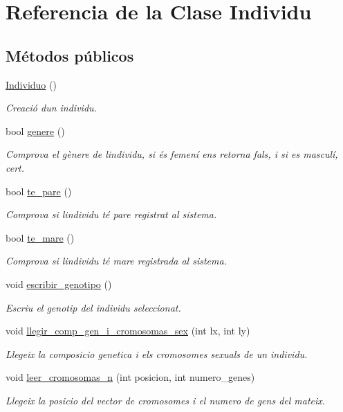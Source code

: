 \hypertarget{class_individu}{}\section{Referencia de la Clase Individu}
\label{class_individu}
\subsection*{Métodos públicos}
\begin{DoxyCompactItemize}
\item 
\hyperlink{class_individu_ab4416ff2c59e726dde0e43bc1789bcd1}{Individuo} ()
\begin{DoxyCompactList}\small\item\em Creació d\textquotesingle{}un individu. \end{DoxyCompactList}\item 
bool \hyperlink{class_individu_a65703ed67fc7ae3680f029ab299ca0c6}{genere} ()
\begin{DoxyCompactList}\small\item\em Comprova el gènere de l\textquotesingle{}individu, si és femení ens retorna fals, i si es masculí, cert. \end{DoxyCompactList}\item 
bool \hyperlink{class_individu_a6972de5e5cf268c724109924d4d9e1b1}{te\+\_\+pare} ()
\begin{DoxyCompactList}\small\item\em Comprova si l\textquotesingle{}individu té pare registrat al sistema. \end{DoxyCompactList}\item 
bool \hyperlink{class_individu_a611aebc390831b301a7369ea6dad4e46}{te\+\_\+mare} ()
\begin{DoxyCompactList}\small\item\em Comprova si l\textquotesingle{}individu té mare registrada al sistema. \end{DoxyCompactList}\item 
void \hyperlink{class_individu_a78858253fa55421333328229e52cdd83}{escribir\+\_\+genotipo} ()
\begin{DoxyCompactList}\small\item\em Escriu el genotip del individu seleccionat. \end{DoxyCompactList}\item 
void \hyperlink{class_individu_aea43bd466e3296757dc38f415181617c}{llegir\+\_\+comp\+\_\+gen\+\_\+i\+\_\+cromosomas\+\_\+sex} (int lx, int ly)
\begin{DoxyCompactList}\small\item\em Llegeix la composicio genetica i els cromosomes sexuals de un individu. \end{DoxyCompactList}\item 
void \hyperlink{class_individu_aa08ba93568733dcfeea8de98931e457f}{leer\+\_\+cromosomas\+\_\+n} (int posicion, int numero\+\_\+genes)
\begin{DoxyCompactList}\small\item\em Llegeix la posicio del vector de cromosomes i el numero de gens del mateix. \end{DoxyCompactList}\end{DoxyCompactItemize}


